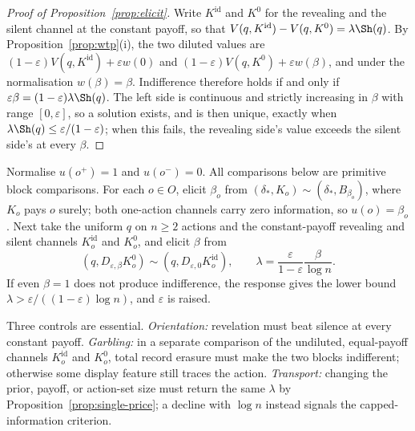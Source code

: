 \begin{proof}[Proof of Proposition~\ref{prop:elicit}]
Write $K^{\mathrm{id}}$ and $K^{0}$ for the revealing and the silent channel at the constant payoff, so that
$V(q,K^{\mathrm{id}})-V(q,K^{0})=\lambda\Sh(q)$.  By Proposition~\ref{prop:wtp}\textup{(i)}, the two diluted
values are $(1-\varepsilon)V(q,K^{\mathrm{id}})+\varepsilon w(0)$ and
$(1-\varepsilon)V(q,K^{0})+\varepsilon w(\beta)$, and under the normalisation $w(\beta)=\beta$.  Indifference
therefore holds if and only if $\varepsilon\beta=(1-\varepsilon)\lambda\Sh(q)$.  The left side is continuous and
strictly increasing in $\beta$ with range $[0,\varepsilon]$, so a solution exists, and is then unique, exactly
when $\lambda\Sh(q)\le\varepsilon/(1-\varepsilon)$; when this fails, the revealing side's value exceeds the
silent side's at every $\beta$.
\end{proof}

\begin{remark}\label{rem:elicitation}
Normalise $u(o^+)=1$ and $u(o^-)=0$.  All comparisons below are primitive
block comparisons.  For each $o\in O$, elicit $\beta_o$ from
$(\delta_\ast,K_o)\sim(\delta_\ast,B_{\beta_o})$, where $K_o$ pays $o$
surely; both one-action channels carry zero information, so
$u(o)=\beta_o$.  Next take the uniform $q$ on $n\ge2$ actions and the
constant-payoff revealing and silent channels $K_o^{\mathrm{id}}$ and
$K_o^0$, and elicit $\beta$ from
\[
 (q,D_{\varepsilon,\beta}K_o^0)
 \sim(q,D_{\varepsilon,0}K_o^{\mathrm{id}}),
 \qquad
 \lambda=\frac{\varepsilon}{1-\varepsilon}\frac{\beta}{\log n}.
\]
If even $\beta=1$ does not produce indifference, the response gives the lower bound
$\lambda>\varepsilon/((1-\varepsilon)\log n)$, and $\varepsilon$ is raised.

Three controls are essential.  \emph{Orientation:} revelation must beat
silence at every constant payoff.  \emph{Garbling:} in a separate comparison of the undiluted,
equal-payoff channels $K_o^{\mathrm{id}}$ and $K_o^0$, total record
erasure must make the two blocks indifferent; otherwise some display feature
still traces the action.  \emph{Transport:} changing the prior, payoff, or
action-set size must return the same $\lambda$ by
Proposition~\ref{prop:single-price}; a decline with $\log n$ instead signals
the capped-information criterion.
\end{remark}
